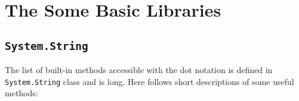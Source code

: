 \chapter{The Some Basic Libraries}
\label{chap:collection}


\section{\lstinline{System.String}}
\label{sec:system.string}
The list of built-in methods accessible with the dot notation is defined in \lstinline|System.String| class and is long. Here follows short descriptions of some useful methods:

